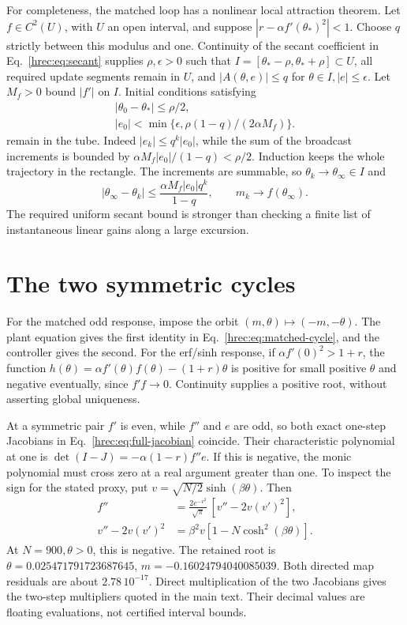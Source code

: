 For completeness, the matched loop has a nonlinear local attraction theorem. Let \(f\in C^2(U)\), with \(U\) an open interval, and suppose
\(|r-\alpha f'(\theta_*)^2|<1\).
Choose \(q\) strictly between this modulus and one. Continuity of the secant coefficient in Eq.~\eqref{hrec:eq:secant} supplies \(\rho,\epsilon>0\) such that \(I=[\theta_*-\rho,\theta_*+\rho]\subset U\), all required update segments remain in \(U\), and \(|A(\theta,e)|\le q\) for \(\theta\in I,|e|\le\epsilon\). Let \(M_f>0\) bound \(|f'|\) on \(I\). Initial conditions satisfying
\[
 \begin{gathered}
 |\theta_0-\theta_*|\le\rho/2,\\
 |e_0|<\min\{\epsilon,\rho(1-q)/(2\alpha M_f)\}.
 \end{gathered}
\]
remain in the tube. Indeed \(|e_k|\le q^k|e_0|\), while the sum of the broadcast increments is bounded by
\(\alpha M_f|e_0|/(1-q)<\rho/2\).
Induction keeps the whole trajectory in the rectangle. The increments are summable, so \(\theta_k\to\theta_\infty\in I\) and
\[
 |\theta_\infty-\theta_k|
 \le\frac{\alpha M_f|e_0|q^k}{1-q},\qquad
 m_k\to f(\theta_\infty).
\]
The required uniform secant bound is stronger than checking a finite list of instantaneous linear gains along a large excursion.

\section{The two symmetric cycles}
\label{hrec:app:cycles}
For the matched odd response, impose the orbit
\((m,\theta)\mapsto(-m,-\theta)\).
The plant equation gives the first identity in Eq.~\eqref{hrec:eq:matched-cycle}, and the controller gives the second. For the erf/sinh response, if
\(\alpha f'(0)^2>1+r\), the function
\(h(\theta)=\alpha f'(\theta)f(\theta)-(1+r)\theta\)
is positive for small positive \(\theta\) and negative eventually, since \(f'f\to0\). Continuity supplies a positive root, without asserting global uniqueness.

At a symmetric pair \(f'\) is even, while \(f''\) and \(e\) are odd, so both exact one-step Jacobians in Eq.~\eqref{hrec:eq:full-jacobian} coincide. Their characteristic polynomial at one is
\(\det(I-J)=-\alpha(1-r)f''e\).
If this is negative, the monic polynomial must cross zero at a real argument greater than one. To inspect the sign for the stated proxy, put \(v=\sqrt{N/2}\sinh(\beta\theta)\). Then
\[
 \begin{aligned}
 f''&=\frac{2e^{-v^2}}{\sqrt\pi}\,[v''-2v(v')^2],\\
 v''-2v(v')^2&=\beta^2v[1-N\cosh^2(\beta\theta)].
 \end{aligned}
\]
At \(N=900,\theta>0\), this is negative. The retained root is
\(\theta=0.025471791723687645\), \(m=-0.16024794040085039\).
Both directed map residuals are about \(2.78\,10^{-17}\). Direct multiplication of the two Jacobians gives the two-step multipliers quoted in the main text. Their decimal values are floating evaluations, not certified interval bounds.


